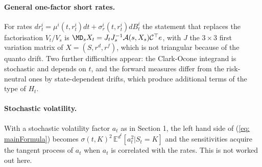 \paragraph{General one-factor short rates.} For rates $dr^i_t=\mu^i(t,r^i_t)dt+\sigma^i_r(t,r^i_t)dB^i_t$ the statement that replaces the factorisation $V_t/V_s$ is $\MD_sX_t=J_tJ_s^{-1}\mathcal{A}(s,X_s)\mathcal{C}^\top e$, with $J$ the $3\times3$ first variation matrix of $X=(S,r^d,r^f)$, which is not triangular because of the quanto drift. Two further difficulties appear: the Clark-Ocone integrand is stochastic and depends on $t$, and the forward measures differ from the risk-neutral ones by state-dependent drifts, which produce additional terms of the type of $H_t$.

\paragraph{Stochastic volatility.} With a stochastic volatility factor $a_t$ as in Section 1, the left hand side of (\ref{eq: mainFormula}) becomes $\sigma(t,K)^2\,\mathbb{E}^{d^t}[a_t^2|S_t=K]$ and the sensitivities acquire the tangent process of $a_t$ when $a_t$ is correlated with the rates. This is not worked out here.

\appendix
